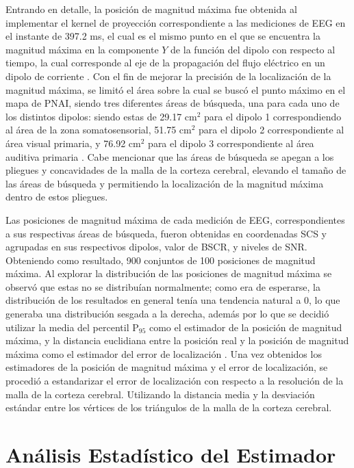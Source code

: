 Entrando en detalle, la posición de magnitud máxima fue obtenida al implementar el kernel de proyección correspondiente a las mediciones de EEG en el instante de 397.2 ms, el cual es el mismo punto en el que se encuentra la magnitud máxima en la componente $Y$  de la función del dipolo con respecto al tiempo, la cual corresponde al eje de la propagación del flujo eléctrico en un dipolo de corriente . Con el fin de mejorar la precisión de la localización de la magnitud máxima, se limitó el área sobre la cual se buscó el punto máximo en el mapa de PNAI, siendo tres diferentes áreas de búsqueda, una para cada uno de los distintos dipolos: siendo estas de 29.17 cm$^2$ para el dipolo 1 correspondiendo al área de la zona somatosensorial, 51.75 cm$^2$ para el dipolo 2 correspondiente al área visual primaria, y 76.92 cm$^2$ para el dipolo 3 correspondiente al área auditiva primaria . Cabe mencionar que las áreas de búsqueda se apegan a los pliegues y concavidades de la malla de la corteza cerebral, elevando el tamaño de las áreas de búsqueda y permitiendo la localización de la magnitud máxima dentro de estos pliegues.

Las posiciones de magnitud máxima de cada medición de EEG, correspondientes a sus respectivas áreas de búsqueda, fueron obtenidas en coordenadas SCS y agrupadas en sus respectivos dipolos, valor de BSCR, y niveles de SNR. Obteniendo como resultado, 900 conjuntos de 100 posiciones de magnitud máxima. Al explorar la distribución de las posiciones de magnitud máxima se observó que estas no se distribuían normalmente; como era de esperarse, la distribución de los resultados en general tenía una tendencia natural a 0, lo que generaba una distribución sesgada a la derecha, además por lo que se decidió utilizar la media del percentil P$_{95}$ como el estimador de la posición de magnitud máxima, y la distancia euclidiana entre la posición real y la posición de magnitud máxima como el estimador del error de localización . Una vez obtenidos los estimadores de la posición de magnitud máxima y el error de localización, se procedió a estandarizar el error de localización con respecto a la resolución de la malla de la corteza cerebral. Utilizando la distancia media y la desviación estándar entre los vértices de los triángulos de la malla de la corteza cerebral.

\section{Análisis Estadístico del Estimador}
\label{sec:methodology:statistical}

